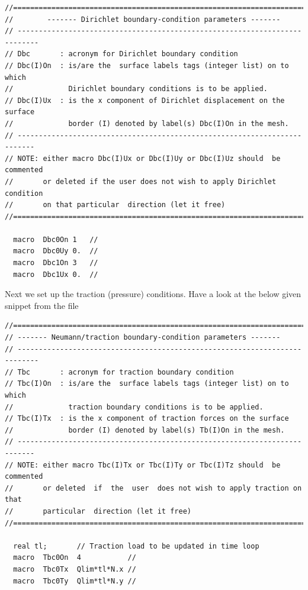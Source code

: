 \begin{lstlisting}[style=CppStyle]
//============================================================================
//        ------- Dirichlet boundary-condition parameters -------             
// ---------------------------------------------------------------------------
// Dbc       : acronym for Dirichlet boundary condition                       
// Dbc(I)On  : is/are the  surface labels tags (integer list) on to which     
//             Dirichlet boundary conditions is to be applied.                
// Dbc(I)Ux  : is the x component of Dirichlet displacement on the surface    
//             border (I) denoted by label(s) Dbc(I)On in the mesh.           
// -------------------------------------------------------------------------- 
// NOTE: either macro Dbc(I)Ux or Dbc(I)Uy or Dbc(I)Uz should  be commented   
//       or deleted if the user does not wish to apply Dirichlet  condition   
//       on that particular  direction (let it free)                          
//============================================================================
                                                                              
  macro  Dbc0On 1   //                            
  macro  Dbc0Uy 0.  //                                               
  macro  Dbc1On 3   //                            
  macro  Dbc1Ux 0.  // 
\end{lstlisting}

Next we set up the traction (pressure) conditions. Have a look at the
below given snippet from the file 

\begin{lstlisting}[style=CppStyle]
//============================================================================
// ------- Neumann/traction boundary-condition parameters -------             
// ---------------------------------------------------------------------------
// Tbc       : acronym for traction boundary condition                        
// Tbc(I)On  : is/are the  surface labels tags (integer list) on to which     
//             traction boundary conditions is to be applied.                 
// Tbc(I)Tx  : is the x component of traction forces on the surface           
//             border (I) denoted by label(s) Tb(I)On in the mesh.            
// -------------------------------------------------------------------------- 
// NOTE: either macro Tbc(I)Tx or Tbc(I)Ty or Tbc(I)Tz should  be commented   
//       or deleted  if  the  user  does not wish to apply traction on that   
//       particular  direction (let it free)                                  
//============================================================================
                                                                              
  real tl;       // Traction load to be updated in time loop                
  macro  Tbc0On  4           //                                      
  macro  Tbc0Tx  Qlim*tl*N.x //                                      
  macro  Tbc0Ty  Qlim*tl*N.y //  
\end{lstlisting}

